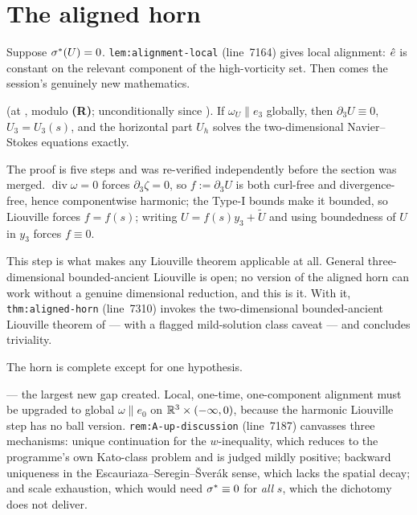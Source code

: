 \section{The aligned horn}
\label{sec:aligned-horn}

Suppose \(\sigma^{*}(U)=0\). \texttt{lem:alignment-local} (line~7164) gives local
alignment: \(\hat{e}\) is constant on the relevant component of the
high-vorticity set. Then comes the session's genuinely new mathematics.

\begin{statement}
\label{st:harmonic}
\PROVED{} (at , modulo \textbf{(R)}; unconditionally since ).
If \(\omega_U\parallel e_3\) globally, then \(\partial_3U\equiv0\),
\(U_3=U_3(s)\), and the horizontal part \(U_h\) solves the two-dimensional
Navier--Stokes equations exactly.
\end{statement}

The proof is five steps and was re-verified independently before the section
was merged. \(\operatorname{div}\omega=0\) forces \(\partial_3\zeta=0\), so
\(f:=\partial_3U\) is both curl-free and divergence-free, hence componentwise
harmonic; the Type-I bounds make it bounded, so Liouville forces \(f=f(s)\);
writing \(U=f(s)y_3+\tilde U\) and using boundedness of \(U\) in \(y_3\)
forces \(f\equiv0\).

This step is what makes any Liouville theorem applicable at all. General
three-dimensional bounded-ancient Liouville is open; no version of the aligned
horn can work without a genuine dimensional reduction, and this is it. With it,
\texttt{thm:aligned-horn} (line~7310) invokes the two-dimensional
bounded-ancient Liouville theorem of \cite{KNSS2009} --- with a flagged
mild-solution class caveat --- and concludes triviality.

The horn is complete except for one hypothesis.

\begin{statement}
\label{st:aup}
\OPEN{} --- the largest new gap  created. Local, one-time,
one-component alignment must be upgraded to global \(\omega\parallel e_0\) on
\(\mathbb{R}^3\times(-\infty,0)\), because the harmonic Liouville step has no ball
version. \texttt{rem:A-up-discussion} (line~7187) canvasses three mechanisms:
unique continuation for the \(w\)-inequality, which reduces to the programme's
own Kato-class problem and is judged mildly positive; backward uniqueness in
the Escauriaza--Seregin--\v{S}ver\'ak sense, which lacks the spatial decay;
and scale exhaustion, which would need \(\sigma^{*}\equiv0\) for \emph{all} \(s\),
which the dichotomy does not deliver.
\end{statement}

